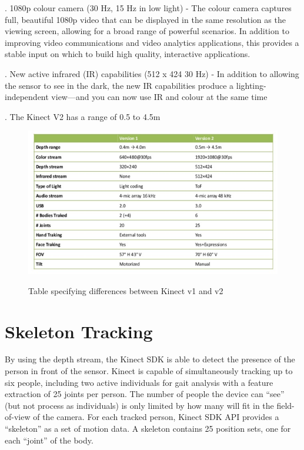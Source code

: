 .	1080p colour camera (30 Hz, 15 Hz in low light) - The colour camera captures full, beautiful 1080p video that can be displayed in the same resolution as the viewing screen, allowing for a broad range of powerful scenarios. In addition to improving video communications and video analytics applications, this provides a stable input on which to build high quality, interactive applications.

.	New active infrared (IR) capabilities (512 x 424 30 Hz) - In addition to allowing the sensor to see in the dark, the new IR capabilities produce a lighting-independent view—and you can now use IR and colour at the same time

.	The Kinect V2 has a range of 0.5 to 4.5m


\begin{figure}[H]
\centering
{\includegraphics[scale=0.75]{specif.png}}
\caption{Table specifying differences between Kinect v1 and v2}
\end{figure}



\section{Skeleton Tracking} \label{Skeleton Tracking} 
\noindent By using the depth stream, the Kinect SDK is able to detect the presence of the person in front of the sensor. Kinect is capable of simultaneously tracking up to six people, including two active individuals for gait analysis with a feature extraction of 25 joints per person. The number of people the device can “see” (but not process as individuals) is only limited by how many will fit in the field-of-view of the camera. For each tracked person, Kinect SDK API provides a “skeleton” as a set of motion data. A skeleton contains 25 position sets, one for each “joint” of the body.





